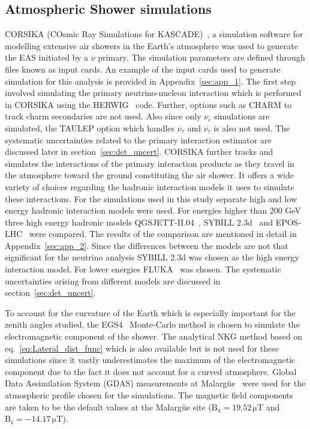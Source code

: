 \subsection{Atmospheric Shower simulations}
\label{subsec:sim_EAS}
CORSIKA (COsmic Ray Simulations for KASCADE)~\cite{Heck:1998vt}, a simulation software for modelling extensive air showers in the Earth's atmosphere was used to generate the EAS initiated by a $\nu$ primary. The simulation parameters are defined through files known as input cards. An example of the input cards used to generate simulation for this analysis is provided in Appendix~\ref{sec:app_1}. The first step involved simulating the primary neutrino-nucleon interaction which is performed in CORSIKA using the HERWIG~\cite{Corcella:2000bw} code. Further, options such as CHARM to track charm secondaries are not used. Also since only $\nu_e$ simulations are simulated, the TAULEP option which handles $\nu_{\tau}$ and $\overline{\nu_{\tau}}$ is also not used. The systematic uncertainties related to the primary interaction estimator are discussed later in section~\ref{sec:det_uncert}. CORSIKA further tracks and simulates the interactions of the primary interaction products as they travel in the atmosphere toward the ground constituting the air shower. It offers a wide variety of choices regarding the hadronic interaction models it uses to simulate these interactions. For the simulations used in this study separate high and low energy hadronic interaction models were used. For energies higher than 200 GeV three high energy hadronic models QGSJETT-II.04~\cite{Ostapchenko:2010vb}, SYBILL 2.3d~\cite{Riehn:2019jet} and EPOS-LHC~\cite{Pierog:2013ria} were compared. The results of the comparison are mentioned in detail in Appendix~\ref{sec:app_2}. Since the differences between the models are not that significant for the neutrino analysis SYBILL 2.3d was chosen as the high energy interaction model. For lower energies FLUKA~\cite{Ferrari:2005zk,Battistoni:2015epi} was chosen. The systematic uncertainties arising from different models are discussed in section~\ref{sec:det_uncert}.  

To account for the curvature of the Earth which is especially important for the zenith angles studied, the EGS4~\cite{Nelson:1990sr} Monte-Carlo method is chosen to simulate the electromagnetic component of the shower. The analytical NKG method based on eq.~\ref{eq:Lateral_dist_func} which is also available but is not used for these simulations since it vastly underestimates the maximum of the electromagnetic component due to the fact it does not account for a curved atmosphere. Global Data Assimilation System (GDAS) measurements at Malargüe~\cite{PierreAuger:2012jsu} were used for the atmospheric profile chosen for the simulations. The magnetic field components are taken to be the default values at the Malargüe site ($\mathrm{B_x = 19.52\,\mu T}$ and $\mathrm{B_z = -14.17 \,\mu T}$). 

